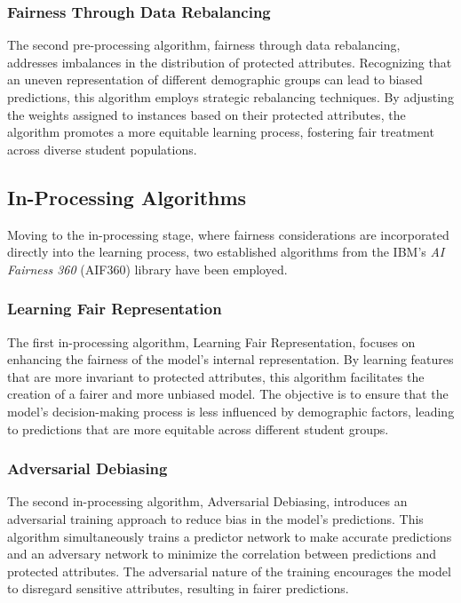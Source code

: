\documentclass[12pt,a4paper,openright,twoside]{book}
\begin{document}
\subsubsection{Fairness Through Data Rebalancing}

The second pre-processing algorithm, fairness through data rebalancing, addresses imbalances in the distribution of protected attributes. Recognizing that an uneven representation of different demographic groups can lead to biased predictions, this algorithm employs strategic rebalancing techniques. By adjusting the weights assigned to instances based on their protected attributes, the algorithm promotes a more equitable learning process, fostering fair treatment across diverse student populations.

\subsection{In-Processing Algorithms}

Moving to the in-processing stage, where fairness considerations are incorporated directly into the learning process, two established algorithms from the IBM's \emph{AI Fairness 360} (AIF360) library have been employed.

\subsubsection{Learning Fair Representation}

The first in-processing algorithm, Learning Fair Representation, focuses on enhancing the fairness of the model's internal representation. By learning features that are more invariant to protected attributes, this algorithm facilitates the creation of a fairer and more unbiased model. The objective is to ensure that the model's decision-making process is less influenced by demographic factors, leading to predictions that are more equitable across different student groups.

\subsubsection{Adversarial Debiasing}

The second in-processing algorithm, Adversarial Debiasing, introduces an adversarial training approach to reduce bias in the model's predictions. This algorithm simultaneously trains a predictor network to make accurate predictions and an adversary network to minimize the correlation between predictions and protected attributes. The adversarial nature of the training encourages the model to disregard sensitive attributes, resulting in fairer predictions.
\end{document}
